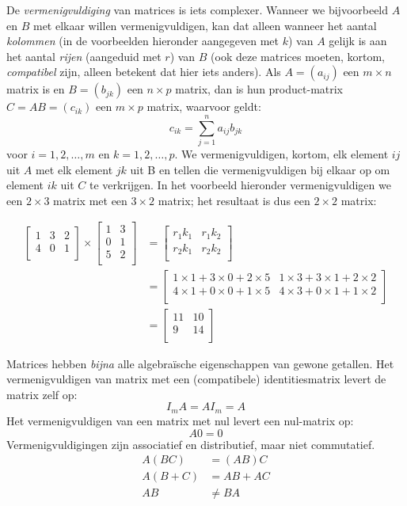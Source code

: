 De \textit{vermenigvuldiging} van matrices is iets complexer. Wanneer we bijvoorbeeld $A$ en $B$ met elkaar willen vermenigvuldigen, kan dat alleen wanneer het aantal \textit{kolommen} (in de voorbeelden hieronder aangegeven met $k$) van $A$ gelijk is aan het aantal \textit{rijen} (aangeduid met $r$) van $B$ (ook deze matrices moeten, kortom, \textit{compatibel} zijn, alleen betekent dat hier iets anders). Als $A=(a_{ij})$ een $m \times n$ matrix is en $B=(b_{jk})$ een $n \times p$ matrix, dan is hun product-matrix $C=AB=(c_{ik})$ een $m \times p$ matrix, waarvoor geldt:
%
\[
c_{ik} = \sum_{j=1}^n{a_{ij}b_{jk}}
\]
%
voor $i=1,2,\hdots,m$ en $k=1, 2, \hdots, p$. We vermenigvuldigen, kortom, elk element $ij$ uit $A$ met elk element $jk$ uit B en tellen die vermenigvuldigen bij elkaar op om element $ik$ uit $C$ te verkrijgen. In het voorbeeld hieronder vermenigvuldigen we een $2 \times 3$ matrix met een $3 \times 2$ matrix; het resultaat is dus een $2 \times 2$ matrix:


\[
\begin{aligned}
\begin{bmatrix}
1 & 3 & 2 \\
4 & 0 & 1 \\
\end{bmatrix} \times
\begin{bmatrix} 
1 & 3 \\
0 & 1 \\
5 & 2 \\
\end{bmatrix} &=
\begin{bmatrix}
r_1k_1 & r_1k_2 \\
r_2k_1 & r_2k_2 \\
\end{bmatrix} \\
&=
\begin{bmatrix}
1 \times 1 + 3 \times 0 + 2 \times 5 & 1 \times 3 + 3 \times 1 + 2 \times 2 \\
4 \times 1 + 0 \times 0 + 1 \times 5 & 4 \times 3 + 0 \times 1 + 1 \times 2 \\
\end{bmatrix} \\
&= 
\begin{bmatrix}
11 & 10 \\
9 & 14 \\
\end{bmatrix}
\end{aligned}
\]

Matrices hebben \textit{bijna} alle algebraïsche eigenschappen van gewone getallen. Het vermenigvuldigen van matrix met een (compatibele) identitiesmatrix levert de matrix zelf op:
%
\[
I_mA = AI_m = A
\]
%
Het vermenigvuldigen van een matrix met nul levert een nul-matrix op:
%
\[
A0 = 0
\]
%
Vermenigvuldigingen zijn associatief en distributief, maar niet commutatief.
%
\[
\begin{aligned}
A(BC) &= (AB)C\\
A(B+C) &= AB + AC \\
AB &\neq BA\\
\end{aligned}
\]
%


